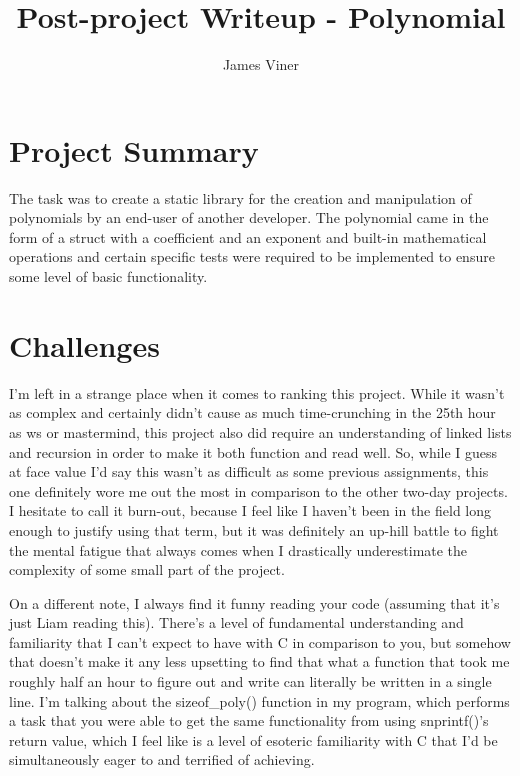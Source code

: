 \documentclass[11pt]{report}
\begin{document}
\title{Post-project Writeup - Polynomial}
\author{James Viner}
\date{} %

\maketitle

\doublespacing

\section*{Project Summary}
The task was to create a static library for the creation and manipulation of polynomials by an end-user of another developer. The polynomial came in the form of a struct with a coefficient and an exponent and built-in mathematical operations and certain specific tests were required to be implemented to ensure some level of basic functionality.
\section*{Challenges}
I'm left in a strange place when it comes to ranking this project. While it wasn't as complex and certainly didn't cause as much time-crunching in the 25th hour as ws or mastermind, this project also did require an understanding of linked lists and recursion in order to make it both function and read well. So, while I guess at face value I'd say this wasn't as difficult as some previous assignments, this one definitely wore me out the most in comparison to the other two-day projects. I hesitate to call it burn-out, because I feel like I haven't been in the field long enough to justify using that term, but it was definitely an up-hill battle to fight the mental fatigue that always comes when I drastically underestimate the complexity of some small part of the project.

On a different note, I always find it funny reading your code (assuming that it's just Liam reading this). There's a level of fundamental understanding and familiarity that I can't expect to have with C in comparison to you, but somehow that doesn't make it any less upsetting to find that what a function that took me roughly half an hour to figure out and write can literally be written in a single line. I'm talking about the sizeof\_poly() function in my program, which performs a task that you were able to get the same functionality from using snprintf()'s return value, which I feel like is a level of esoteric familiarity with C that I'd be simultaneously eager to and terrified of achieving.
\end{document}
